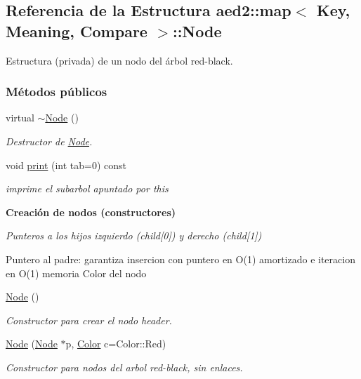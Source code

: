 \hypertarget{structaed2_1_1map_1_1Node}{\subsection{\-Referencia de la \-Estructura aed2\-:\-:map$<$ \-Key, \-Meaning, \-Compare $>$\-:\-:\-Node}
\label{structaed2_1_1map_1_1Node}
}


\-Estructura (privada) de un nodo del árbol red-\/black.  


\subsubsection*{\-Métodos públicos}
\begin{DoxyCompactItemize}
\item 
virtual \hyperlink{structaed2_1_1map_1_1Node_a4f3cb2cc4302fe96432e624ced147540_a4f3cb2cc4302fe96432e624ced147540}{$\sim$\-Node} ()
\begin{DoxyCompactList}\small\item\em \-Destructor de \hyperlink{structaed2_1_1map_1_1Node}{\-Node}. \end{DoxyCompactList}\item 
void \hyperlink{structaed2_1_1map_1_1Node_a1c56c9d119479b77b8abb7343a224c7a_a1c56c9d119479b77b8abb7343a224c7a}{print} (int tab=0) const 
\begin{DoxyCompactList}\small\item\em imprime el subarbol apuntado por this \end{DoxyCompactList}\end{DoxyCompactItemize}
\begin{Indent}{\bf \-Creación de nodos (constructores)}\par
{\em \-Punteros a los hijos izquierdo (child\mbox{[}0\mbox{]}) y derecho (child\mbox{[}1\mbox{]})

\-Puntero al padre\-: garantiza insercion con puntero en \-O(1) amortizado e iteracion en \-O(1) memoria \-Color del nodo }\begin{DoxyCompactItemize}
\item 
\hyperlink{structaed2_1_1map_1_1Node_a9c1a600491066ce7eb669b1cb76d56c6_a9c1a600491066ce7eb669b1cb76d56c6}{\-Node} ()
\begin{DoxyCompactList}\small\item\em \-Constructor para crear el nodo header. \end{DoxyCompactList}\item 
\hyperlink{structaed2_1_1map_1_1Node_a62b5a42e88e219d53af8237a9ebedb6e_a62b5a42e88e219d53af8237a9ebedb6e}{\-Node} (\hyperlink{structaed2_1_1map_1_1Node}{\-Node} $\ast$p, \hyperlink{classaed2_1_1map_a6d62a415a4b9d320b30cada4ebcf9f5b_a6d62a415a4b9d320b30cada4ebcf9f5b}{\-Color} c=\-Color\-::\-Red)
\begin{DoxyCompactList}\small\item\em \-Constructor para nodos del arbol red-\/black, sin enlaces. \end{DoxyCompactList}\end{DoxyCompactItemize}
\end{Indent}
